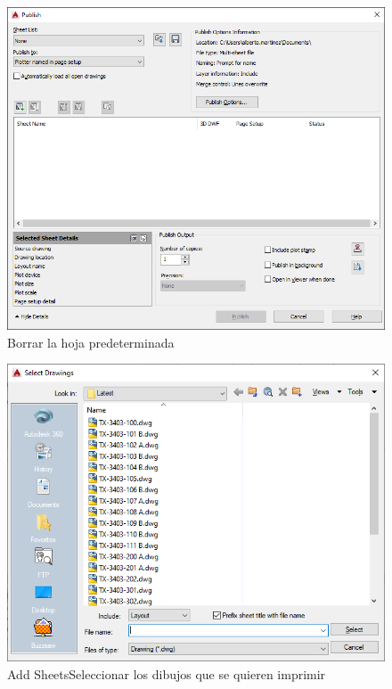 \documentclass{report}
\begin{document}
\begin{figure}[H]
	\centering
	\includegraphics[width=0.85\linewidth, height=0.5\textheight,keepaspectratio]{Imagenes/autocad_publish_02}
	\caption{Borrar la hoja predeterminada}
	\label{fig:autocadpublish02}
\end{figure}

\begin{figure}[H]
	\centering
	\includegraphics[width=0.85\linewidth, height=0.5\textheight,keepaspectratio]{Imagenes/autocad_publish_03}
	\caption{Add Sheets\textrightarrow Seleccionar los dibujos que se quieren imprimir}
	\label{fig:autocadpublish03}
\end{figure}


\begin{center}
\end{center}
\end{document}
